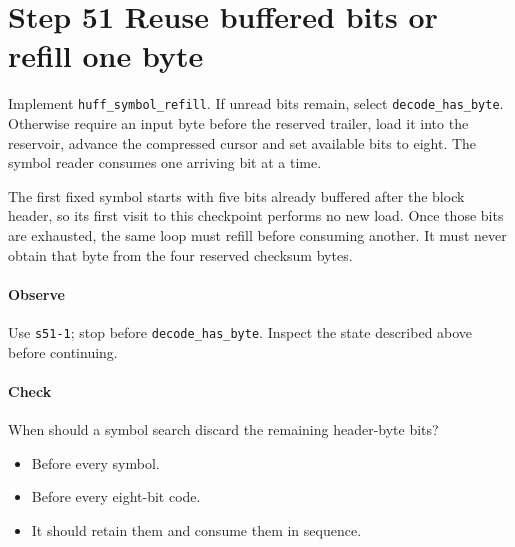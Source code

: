 \section{Step 51 Reuse buffered bits or refill one byte}\label{png-huff-s51}
Implement \texttt{huff\_symbol\_refill}. If unread bits remain, select \texttt{decode\_has\_byte}. Otherwise require an input byte before the reserved trailer, load it into the reservoir, advance the compressed cursor and set available bits to eight. The symbol reader consumes one arriving bit at a time.

The first fixed symbol starts with five bits already buffered after the block header, so its first visit to this checkpoint performs no new load. Once those bits are exhausted, the same loop must refill before consuming another. It must never obtain that byte from the four reserved checksum bytes.

\paragraph{Observe} Use \texttt{s51-1}; stop before \texttt{decode\_has\_byte}. Inspect the state described above before continuing.

\paragraph{Check} When should a symbol search discard the remaining header-byte bits?
\begin{itemize}
  \item[A.] Before every symbol.
  \item[B.] Before every eight-bit code.
  \item[C.] It should retain them and consume them in sequence.
\end{itemize}
